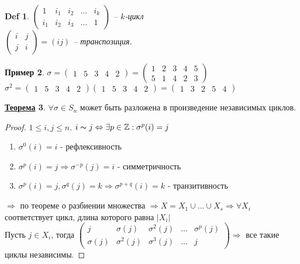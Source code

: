 \documentclass[12pt]{article}
\newenvironment{MyList}[1][4pt]{
  \begin{enumerate}[1.]
  \setlength{\parskip}{0pt}
  \setlength{\itemsep}{#1}
}{       
  \end{enumerate}
}
\theoremstyle{definition} %
\newtheorem{Thm}{\underline{Теорема}}[subsection] %
\newtheorem{Example}[Thm]{Пример} %
\theoremstyle{plain} %
\newtheorem{Def}[Thm]{Def} %
\theoremstyle{remark} %
\begin{document}
{\begin{Def}
    $\left(\begin{array}{ccccc}
            1   & i_1 & i_2 & ... & i_k \\
            i_1 & i_2 & i_3 & ... & 1
        \end{array}\right)$ -- $k$-цикл \\
    $\left(\begin{array}{cc}
            i & j \\
            j & i
        \end{array}\right) = (ij)$ -- транспозиция.
\end{Def}

\begin{Example}

    $\sigma = \left(\begin{array}{ccccc}
            1 & 5 & 3 & 4 & 2
        \end{array}\right) = \left(\begin{array}{ccccc}
            1 & 2 & 3 & 4 & 5 \\
            5 & 1 & 4 & 2 & 3
        \end{array}\right)$  \\
    $\sigma^2 = \left(\begin{array}{ccccc}
            1 & 5 & 3 & 4 & 2
        \end{array}\right)  \left(\begin{array}{ccccc}
            1 & 5 & 3 & 4 & 2
        \end{array}\right)  = \left(\begin{array}{ccccc}
            1 & 3 & 2 & 5 & 4
        \end{array}\right)$
\end{Example}
\begin{Thm} $\forall \sigma \in S_n $ может быть разложена в произведение независимых циклов.
\end{Thm}
\begin{proof}
    $1 \leqslant i, j \leqslant n$. $i \thicksim j \Leftrightarrow \exists p \in \mathbb{Z} : \sigma^p (i) = j$

    \begin{MyList}
        \item $\sigma^0 (i) = i$ - рефлексивность
        \item $\sigma^p (i) = j \Rightarrow \sigma^{-p} (j) = i$ - симметричность
        \item $\sigma^p (i) = j, \sigma^q (j) = k \Rightarrow \sigma^{p + q} (i) = k$ - транзитивность
    \end{MyList}
    $\Rightarrow $ по теореме о разбиении множества $\Rightarrow X = X_1 \cup ... \cup X_s \Rightarrow \forall X_i $ соответствует цикл, длина которого равна $|X_i|$ \\
    Пусть $j \in X_i$, тогда $\left(\begin{array}{ccccc}
                j         & \sigma(j)   & \sigma^2(j) & ... & \sigma^p(j) \\
                \sigma(j) & \sigma^2(j) & \sigma^3(j) & ... & j
            \end{array}\right) \Rightarrow $ все такие циклы независимы.


\end{proof}}
\end{document}
